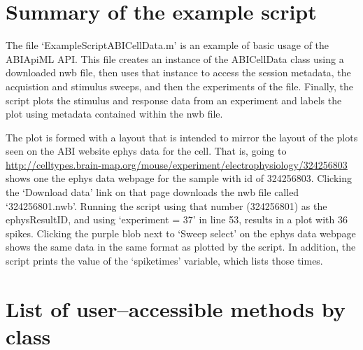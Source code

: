 \documentclass{article}
\begin{document}
\section{Summary of the example script}
The file `ExampleScriptABICellData.m' is an example of basic usage of the ABIApiML API. This file creates an instance of the ABICellData class using a downloaded nwb file, then uses that instance to access the session metadata, the acquistion and stimulus sweeps, and then the experiments of the file. Finally, the script plots the stimulus and response data from an experiment and labels the plot using metadata contained within the nwb file.  

The plot is formed with a layout that is intended to mirror the layout of the plots seen on the ABI website ephys data for the cell.  That is, going to \url{http://celltypes.brain-map.org/mouse/experiment/electrophysiology/324256803} shows one the ephys data webpage for the sample with id of 324256803.  Clicking the `Download data' link on that page downloads the nwb file called `324256801.nwb'.  Running the script using that number (324256801) as the ephysResultID, and using `experiment = 37' in line 53, results in a plot with 36 spikes.  Clicking the purple blob next to `Sweep select' on the ephys data webpage shows the same data in the same format as plotted by the script. In addition, the script prints the value of the `spiketimes' variable, which lists those times.


\section{List of user--accessible methods by class}
\end{document}
